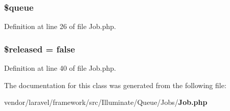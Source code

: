 \subsubsection[{\$queue}]{\setlength{\rightskip}{0pt plus 5cm}\${\bf queue}\hspace{0.3cm}{\ttfamily [protected]}}\label{class_illuminate_1_1_queue_1_1_jobs_1_1_job_a4a0b48f6ae2fcb248a4f0288c7c344a6}


Definition at line 26 of file Job.\+php.

\subsubsection[{\$released}]{\setlength{\rightskip}{0pt plus 5cm}\$released = false\hspace{0.3cm}{\ttfamily [protected]}}\label{class_illuminate_1_1_queue_1_1_jobs_1_1_job_a1a9fdbf4d282a768859c454e38db1642}


Definition at line 40 of file Job.\+php.



The documentation for this class was generated from the following file\+:\begin{DoxyCompactItemize}
\item 
vendor/laravel/framework/src/\+Illuminate/\+Queue/\+Jobs/{\bf Job.\+php}\end{DoxyCompactItemize}
